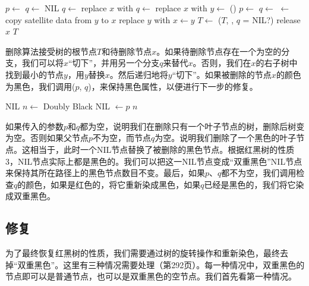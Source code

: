 \documentclass[UTF8]{article}
\begin{document}
\begin{algorithmic}[1]
  \State $p \gets$ 
  \State $q \gets$ NIL
    \State $q \gets$ 
    \State replace $x$ with 
    \State $q \gets$ 
    \State replace $x$ with 
  \Else
    \State $y \gets$ ()
    \State $p \gets$ 
    \State $q \gets$ 
    \State {} $\gets$ 
    \State copy satellite data from $y$ to $x$
    \State replace $y$ with 
    \State $x \gets y$
  \EndIf
    \State $T \gets$ ($T$, , $q$ = NIL?)
  \EndIf
  \State release $x$
  \State \Return $T$
\EndFunction
\end{algorithmic}

删除算法接受树的根节点$T$和待删除节点$x$。如果待删除节点存在一个为空的分支，我们可以将$x$“切下”，并用另一个分支$q$来替代$x$。否则，我们在$x$的右子树中找到最小的节点$y$，用$y$替换$x$。然后递归地将$y$“切下”。如果被删除的节点$x$的颜色为黑色，我们调用($p$, $q$)，来保持黑色属性，以便进行下一步的修复。

\begin{algorithmic}[1]
    \State \Return NIL 
    \State $n \gets$ Doubly Black NIL
    \State {} $\gets p$
    \State \Return $n$
  \Else
    \State \Return {}
  \EndIf
\EndFunction
\end{algorithmic}

如果传入的参数$p$和$q$都为空，说明我们在删除只有一个叶子节点的树，删除后树变为空。否则如果父节点$p$不为空，而节点$q$为空。说明我们删除了一个黑色的叶子节点。这相当于，此时一个NIL节点替换了被删除的黑色节点。根据红黑树的性质3，NIL节点实际上都是黑色的。我们可以把这一NIL节点变成“双重黑色”NIL节点来保持其所在路径上的黑色节点数目不变。最后，如果$p$、$q$都不为空，我们调用检查$q$的颜色，如果是红色的，将它重新染成黑色，如果$q$已经是黑色的，我们将它染成双重黑色。

\subsection{修复}

为了最终恢复红黑树的性质，我们需要通过树的旋转操作和重新染色，最终去掉“双重黑色”。这里有三种情况需要处理（\cite{CLRS}第292页）。每一种情况中，双重黑色的节点即可以是普通节点，也可以是双重黑色的空节点。我们首先看第一种情况。
\end{document}

